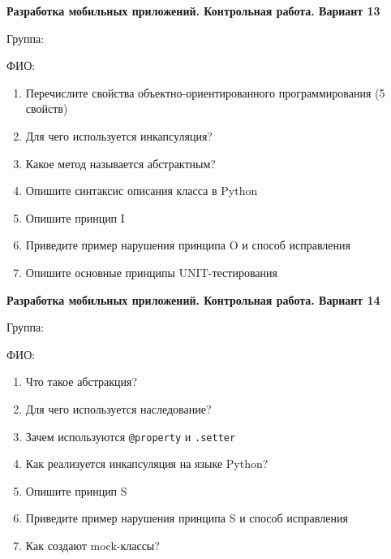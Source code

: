 \documentclass[12pt]{article}
\begin{document}
\vspace{40pt}\begin{minipage}{\textwidth}
\textbf{Разработка мобильных приложений. Контрольная работа. Вариант 13}

Группа: \underline{\hspace{3cm}}

ФИО: \underline{\hspace{10cm}}

\begin{enumerate}
\item Перечислите свойства объектно-ориентированного программирования (5 свойств)
\item Для чего используется инкапсуляция?
\item Какое метод называется абстрактным?
\item Опишите синтаксис описания класса в Python
\item Опишите принцип I
\item Приведите пример нарушения принципа O и способ исправления
\item Опишите основные принципы UNIT-тестирования

\end{enumerate}
\end{minipage}

\vspace{40pt}\begin{minipage}{\textwidth}
\textbf{Разработка мобильных приложений. Контрольная работа. Вариант 14}

Группа: \underline{\hspace{3cm}}

ФИО: \underline{\hspace{10cm}}

\begin{enumerate}
\item Что такое абстракция?
\item Для чего используется наследование?
\item Зачем используются \verb|@property| и \verb|.setter|
\item Как реализуется инкапсуляция на языке Python?
\item Опишите принцип S
\item Приведите пример нарушения принципа S и способ исправления
\item Как создают mock-классы?

\end{enumerate}
\end{minipage}
\end{document}
